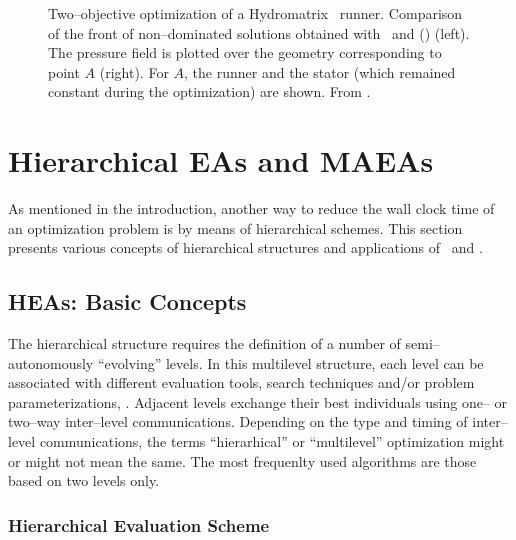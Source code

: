 \documentclass{vki_ls}
\begin{document}
\begin{figure}[!ht]
\begin{minipage}{0.49\linewidth}
        \vspace{0.3cm}
    \end{minipage}
    \caption{Two--objective optimization of a Hydromatrix\textregistered~ 
	     runner. Comparison of the front of non--dominated solutions 
	     obtained with \MAEA\ and \MAEA(\PCA) (left). The pressure field
	     is plotted over the geometry corresponding to point $A$ (right). 
             For $A$, the runner and the stator (which remained constant 
	     during the optimization) are shown. From \cite{LTT_2_054}.}
    \label{f:MatRes}
\end{figure}

%
%
\section[Hierarchical EAs and MAEAs]
{Hierarchical EAs and MAEAs}
\label{s:HMAEA}

As mentioned in the introduction, another way to reduce the wall clock time of an optimization problem is by means of hierarchical schemes. 
This section presents various concepts of hierarchical structures and applications of \HEAs\ and \HMAEAs.

\subsection{HEAs: Basic Concepts}
\label{ss:HEA}

The hierarchical structure requires the definition of a number of semi--autonomously ``evolving'' levels. In this multilevel structure, each level can be associated with different evaluation tools, search techniques and/or problem parameterizations, 
\cite{Herr1999, Sefr2000, Desid2003, LTT_2_031, LTT_3_092, LTT_2_036,
LTT_2_044, LTT_2_048, LTT_4_05}. 
Adjacent levels exchange their best individuals using one-- or two--way 
inter--level communications.
Depending on the type and timing of inter--level communications, the terms ``hierarhical'' or ``multilevel'' optimization might or might not mean the same. The most frequenlty used algorithms are those based on two levels only.

\subsubsection*{Hierarchical Evaluation Scheme}
\end{document}
